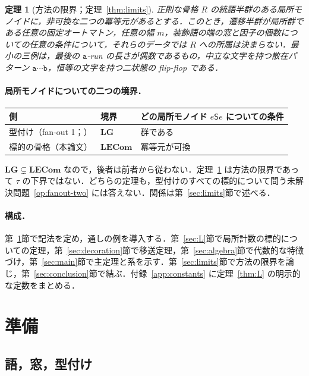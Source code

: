 \documentclass[11pt,a4paper]{ltjsarticle}
\numberwithin{equation}{section}
\theoremstyle{plain}
\theoremstyle{definition}
\theoremstyle{remark}
\theoremstyle{plain}
\newtheorem{mainthm}{定理}
\newcommand{\LG}{\mathbf{LG}}
\newcommand{\LECom}{\mathbf{L}\mathbf{ECom}}
\begin{document}
\setcounter{mainthm}{3}%
\begin{mainthm}[方法の限界；定理~\ref{thm:limits}]
\label{thm:D}
正則な骨格 $R$ の統語半群のある局所モノイドに，非可換な二つの冪等元があるとする．このとき，遷移半群が局所群である任意の固定オートマトン，任意の幅 $m$，装飾語の端の窓と因子の個数についての任意の条件について，それらのデータでは $R$ への所属は決まらない．最小の三例は，最後の $\mathtt a$-run の長さが偶数であるもの，中立な文字を持つ散在パターン $\mathtt a\cdots\mathtt b$，恒等の文字を持つ二状態の flip-flop である．
\end{mainthm}

\paragraph{局所モノイドについての二つの境界．}
\begin{center}
\begin{tabular}{lll}
\toprule
側 & 境界 & どの局所モノイド $e\mathsf Se$ についての条件\\
\midrule
型付け（fan-out 1；\cite{KuriyamaTCS1,KuriyamaTypingClass}） & $\LG$ & 群である\\
標的の骨格（本論文） & $\LECom$ & 冪等元が可換\\
\bottomrule
\end{tabular}
\end{center}
$\LG\subsetneq\LECom$ なので，後者は前者から従わない．定理~\ref{thm:D} は方法の限界であって $\tau$ の下界ではない．どちらの定理も，型付けのすべての標的について問う未解決問題~\ref{op:fanout-two} には答えない．関係は第~\ref{sec:limits}節で述べる．

\paragraph{構成．}
第~\ref{sec:prelim}節で記法を定め，通しの例を導入する．第~\ref{sec:L}節で局所計数の標的についての定理，第~\ref{sec:decoration}節で移送定理，第~\ref{sec:algebra}節で代数的な特徴づけ，第~\ref{sec:main}節で主定理と系を示す．第~\ref{sec:limits}節で方法の限界を論じ，第~\ref{sec:conclusion}節で結ぶ．付録~\ref{app:constants} に定理~\ref{thm:L} の明示的な定数をまとめる．

\section{準備}
\label{sec:prelim}

\subsection{語，窓，型付け}
\end{document}
